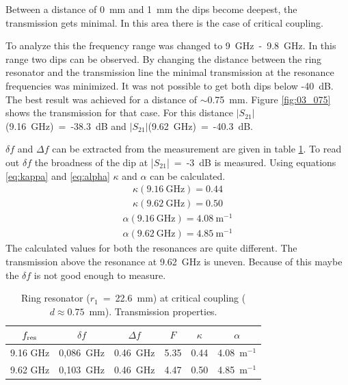 Between a distance of 0~mm and 1~mm the dips become deepest, the transmission gets minimal. In this area there is the case of critical coupling. 

To analyze this the frequency range was changed to 9~GHz~-~9.8~GHz. In this range two dips can be observed. By changing the distance between the ring resonator and the transmission line the minimal transmission at the resonance frequencies was minimized. It was not possible to get both dips below -40~dB. The best result was achieved for a distance of $\sim$0.75~mm. Figure \ref{fig:03_075} shows the transmission for that case.
For this distance $|S_{21}|$(9.16~GHz)~=~-38.3~dB and  $|S_{21}|$(9.62~GHz)~=~-40.3~dB.

$\delta f$ and $\Delta f$ can be extracted from the measurement are given in table \ref{tab:ring_klein}. To read out $\delta f$ the broadness of the dip at |$S_{21}$|~=~-3~dB is measured. 
Using equations \eqref{eq:kappa} and \eqref{eq:alpha} $\kappa$ and $\alpha$ can be calculated.
\begin{equation}
\begin{split}
\kappa(9.16~\mathrm{GHz})=0.44\\
\kappa(9.62~\mathrm{GHz})=0.50
\end{split}
\label{eq:}
\end{equation}
\begin{equation}
\begin{split}
\alpha(9.16~\mathrm{GHz})=4.08~\mathrm{m}^{-1}\\
\alpha(9.62~\mathrm{GHz})=4.85~\mathrm{m}^{-1}
\end{split}
\label{eq:}
\end{equation}
The calculated values for both the resonances are quite different. The transmission above the resonance at 9.62~GHz is uneven. Because of this maybe the $\delta f$ is not good enough to measure. 
\begin{table}%
\centering
\caption{Ring resonator ($r_1$~=~22.6~mm) at critical coupling ($d \approx 0.75$~mm). Transmission properties.}
\begin{tabular}{cccccc}
\toprule
$f_{\mathrm{res}}$	& $\delta f$	& $\Delta f$ & $F$ & $\kappa$ & $\alpha$\\
\midrule
9.16 GHz	& 0,086~GHz	& 0.46~GHz	&	5.35&	0.44 & 4.08~m$^{-1}$\\
9.62 GHz	& 0,103~GHz	& 0.46~GHz	&	4.47	&	0.50 & 4.85~m$^{-1}$\\
\bottomrule 
\end{tabular}
\label{tab:ring_klein}
\end{table}



